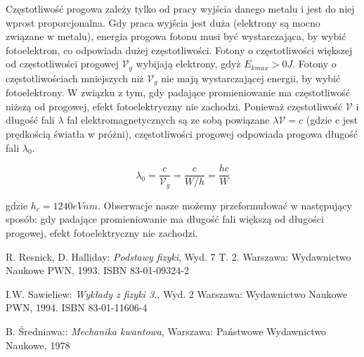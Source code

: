 \documentclass[12pt, a4paper, notitlepage]{report}
\begin{document}
	Częstotliwość progowa zależy tylko od pracy wyjścia danego metalu i jest do
	niej wprost proporcjonalna. Gdy praca wyjścia jest duża (elektrony są mocno
	związane w metalu), energia progowa fotonu musi być wystarczająca, by wybić fotoelektron,
	co odpowiada dużej częstotliwości. Fotony o częstotliwości większej od częstotliwości
	progowej $\mathcal{V}_{g}$ wybijają elektrony, gdyż $E_{kmax}>0J$. Fotony o częstotliwościach
	mniejszych niż $\mathcal{V}_{g}$ nie mają wystarczającej energii, by wybić
	fotoelektrony. W związku z tym, gdy padające promieniowanie ma częstotliwość
	niższą od progowej, efekt fotoelektryczny nie zachodzi. Ponieważ częstotliwość
	$\mathcal{V}$ i długość fali $\lambda$ fal elektromagnetycznych są ze sobą
	powiązane $\lambda \mathcal{V}=c$ (gdzie c jest prędkością światła w próżni), częstotliwości
	progowej odpowiada progowa długość fali $\lambda_{0}$.

	\begin{equation}
		\lambda_{0} =\frac{c}{\mathcal{V}_{g}}=\frac{c}{W/h}=\frac{hc}{W}
	\end{equation}

	gdzie $h_{c}=1240eVnm$. Obserwacje nasze możemy przeformułować w następujący sposób:
	gdy padające promieniowanie ma długość fali większą od długości progowej, efekt
	fotoelektryczny nie zachodzi.

	\begin{thebibliography}{99}
		 R. Resnick, D. Halliday: \emph{Podstawy fizyki}, Wyd. 7 T. 2. Warszawa:
			Wydawnictwo Naukowe PWN, 1993. ISBN 83-01-09324-2

		 I.W. Sawieliew: \emph{Wykłady z fizyki 3.}, Wyd. 2 Warszawa: Wydawnictwo
			Naukowe PWN, 1994. ISBN 83-01-11606-4

		 B. Średniawa:: \emph{Mechanika kwantowa}, Warszawa: Państwowe Wydawnictwo
			Naukowe, 1978
	\end{thebibliography}
\end{document}
